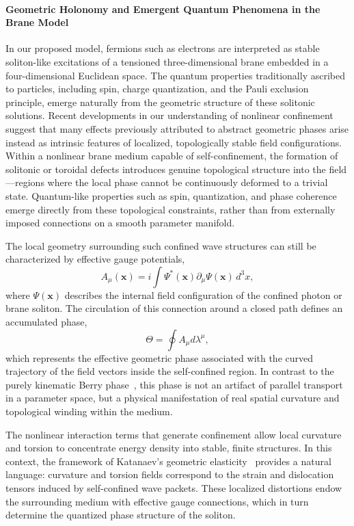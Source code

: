 \paragraph{Geometric Holonomy and Emergent Quantum Phenomena in the
Brane
Model}\label{geometric-holonomy-and-emergent-quantum-phenomena-in-the-brane-model}

In our proposed model, fermions such as electrons are interpreted as
stable soliton-like excitations of a tensioned three-dimensional brane
embedded in a four-dimensional Euclidean space. The quantum properties
traditionally ascribed to particles, including spin, charge
quantization, and the Pauli exclusion principle, emerge naturally from
the geometric structure of these solitonic solutions.
Recent developments in our understanding of nonlinear confinement
suggest that many effects previously attributed to abstract geometric
phases arise instead as intrinsic features of localized, topologically
stable field configurations. Within a nonlinear brane medium capable of
self-confinement, the formation of solitonic or toroidal defects
introduces genuine topological structure into the field—regions where
the local phase cannot be continuously deformed to a trivial state.
Quantum-like properties such as spin, quantization, and phase coherence
emerge directly from these topological constraints, rather than from
externally imposed connections on a smooth parameter manifold.

The local geometry surrounding such confined wave structures can still
be characterized by effective gauge potentials,
\[
A_\mu(\mathbf{x}) = i\int \Psi^*(\mathbf{x}) \partial_\mu \Psi(\mathbf{x}) \, d^3x,
\]
where $\Psi(\mathbf{x})$ describes the internal field configuration of
the confined photon or brane soliton. The circulation of this connection
around a closed path defines an accumulated phase,
\[
\Theta = \oint A_\mu d\lambda^\mu,
\]
which represents the effective geometric phase associated with the
curved trajectory of the field vectors inside the self-confined region.
In contrast to the purely kinematic Berry phase~\cite{Berry1984}, this phase is not an
artifact of parallel transport in a parameter space, but a physical
manifestation of real spatial curvature and topological winding within
the medium.

The nonlinear interaction terms that generate confinement allow local curvature and
torsion to concentrate energy density into stable, finite structures.
In this context, the framework of Katanaev's geometric elasticity~\cite{Katanaev2009}
provides a natural language: curvature and torsion fields correspond to
the strain and dislocation tensors induced by self-confined wave
packets. These localized distortions endow the surrounding medium with
effective gauge connections, which in turn determine the quantized
phase structure of the soliton.

